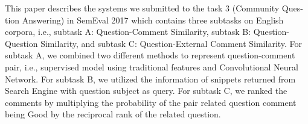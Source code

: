 This paper describes the systems we submitted to the task 3 (Community Ques- tion Answering) in SemEval 2017 which contains three subtasks on English corpora, i.e., subtask A: Question-Comment Similarity, subtask B: Question-Question Similarity, and subtask C: Question-External Comment Similarity. For subtask A, we combined two different methods to represent question-comment pair, i.e., supervised model using traditional features and Convolutional Neural Network. For subtask B, we utilized the information of snippets returned from Search Engine with question subject as query. For subtask C, we ranked the comments by multiplying the probability of the pair related question comment being Good by the reciprocal rank of the related question.
